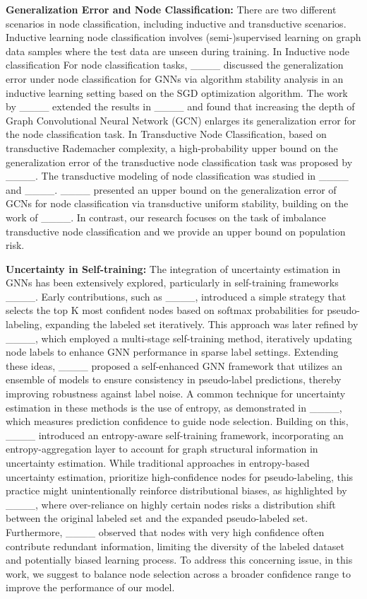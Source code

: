\textbf{Generalization Error and Node Classification:} There are two different scenarios in node classification, including inductive and transductive scenarios. Inductive learning node classification involves (semi-)supervised learning on graph data samples where the test data are unseen during training. In Inductive node classification For node classification tasks, ____ discussed the generalization error under node classification for GNNs via algorithm stability analysis in an inductive learning setting based on the SGD optimization algorithm. The work by ____ extended the results in ____ and found that increasing the depth of Graph Convolutional Neural Network (GCN) enlarges its generalization error for the node classification task. In Transductive Node Classification, based on transductive Rademacher complexity, a high-probability upper bound on the generalization error of the transductive node classification task was proposed by ____. The transductive modeling of node classification was studied in ____ and ____. ____ presented an upper bound on the generalization error of GCNs for node classification via transductive uniform stability, building on the work of ____. In contrast, our research focuses on the task of imbalance transductive node classification and we provide an upper bound on population risk.

\textbf{Uncertainty in Self-training: }
The integration of uncertainty estimation in GNNs has been extensively explored, particularly in self-training frameworks ____. Early contributions, such as ____, introduced a simple strategy that selects the top K most confident nodes based on softmax probabilities for pseudo-labeling, expanding the labeled set iteratively. This approach was later refined by ____, which employed a multi-stage self-training method, iteratively updating node labels to enhance GNN performance in sparse label settings. Extending these ideas, ____ proposed a self-enhanced GNN framework that utilizes an ensemble of models to ensure consistency in pseudo-label predictions, thereby improving robustness against label noise. A common technique for uncertainty estimation in these methods is the use of entropy, as demonstrated in ____, which measures prediction confidence to guide node selection. Building on this, ____ introduced an entropy-aware self-training framework, incorporating an entropy-aggregation layer to account for graph structural information in uncertainty estimation. While traditional approaches in entropy-based uncertainty estimation, prioritize high-confidence nodes for pseudo-labeling, this practice might unintentionally reinforce distributional biases, as highlighted by ____, where over-reliance on highly certain nodes risks a distribution shift between the original labeled set and the expanded pseudo-labeled set. Furthermore, ____ observed that nodes with very high confidence often contribute redundant information, limiting the diversity of the labeled dataset and potentially biased learning process. To address this concerning issue, in this work, we suggest to balance node selection across a broader confidence range to improve the performance of our model.
